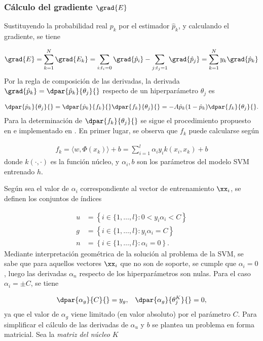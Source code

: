
\subsubsection{Cálculo del gradiente $\grad{E}$}
Sustituyendo la probabilidad real $p_k$ por el estimador
$\hat{p}_k$, y calculando el gradiente, se tiene

\begin{align}
\label{gradE}
  \grad{E} = \sum_{k=1}^{N} \grad{E_k} =
  \sum_{ i:t_i=0  } \grad{\hat{p}_i}
  - \sum_{ j:t_j=1  } \grad{\hat{p}_j}
  = \sum_{k=1}^{N} y_k \grad{\hat{p}_k}
\end{align}
Por la regla de composición de las derivadas, la derivada
$\grad{\hat{p}_k}=\dpar{\hat{p}_k}{\theta_j}{}$ respecto de un
hiperparámetro ${\theta_j}$ es

\begin{align}
  \dpar{\hat{p}_k}{\theta_j}{} =
  \dpar{\hat{p}_k}{f_k}{}\dpar{f_k}{\theta_j}{} =
  -A\hat{p}_k(1-\hat{p}_k)\dpar{f_k}{\theta_j}{}.
  \label{eq:deriv-pk-thetak}
\end{align}
Para la determinación de $\dpar{f_k}{\theta_j}{}$ se sigue el
procedimiento propuesto en \cite{keerthi,glasmachers} e implementado
en \cite{shark}.
En primer lugar, se observa que $f_k$ puede calcularse según

\begin{align}
  f_k = \langle w,\Phi(x_k)\rangle+b = \sum_{i=1}^l \alpha_i y_i k(x_i,x_k) + b
  \label{fk}
\end{align}
donde $k(\cdot,\cdot)$ es la función núcleo, y $\alpha_i, b$ son los
parámetros del modelo SVM entrenado $h$.

Según sea el valor de $\alpha_i$ correspondiente al vector de
entrenamiento $\xx_i$, se definen los conjuntos de índices

\begin{align}
  \label{unbounded-sv-set}
  u &= \left\{i\in\{1,\ldots,l\}:0<y_i\alpha_i<C \right\}\\
  \label{bounded-sv-set}
  g &= \left\{i\in\{1,\ldots,l\}: y_i\alpha_i=C \right\}\\
  n &= \left\{i\in\{1,\ldots,l\}: \alpha_i=0 \right\}.
\end{align}
Mediante interpretación geométrica de la solución al problema de la
SVM, se sabe que para aquellos vectores $\xx_i$ que no son de soporte,
se cumple que $\alpha_i=0$, luego las derivadas $\alpha_n$ respecto de los
hiperparámetros son nulas. Para el caso $\alpha_i=\pm{}C$, se tiene

\begin{align}
  \dpar{\alpha_g}{C}{} = y_g, && \dpar{\alpha_g}{{\theta}^K_j}{} = 0,
\end{align}
ya que el valor de $\alpha_g$ viene limitado (en valor absoluto) por el
parámetro $C$. Para simplificar el cálculo de las derivadas de
$\alpha_u$ y $b$ se plantea un problema en forma matricial. Sea la
\emph{matriz del núcleo} $K$

